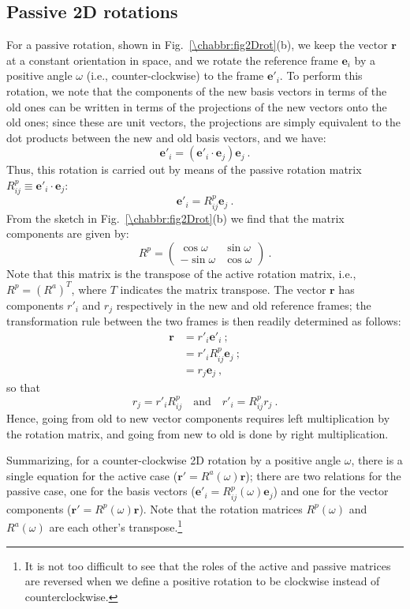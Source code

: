 \subsection{Passive 2D rotations}\label{\chabbr:ssec:2Dpassive}
For a passive rotation, shown in Fig.~\ref{\chabbr:fig2Drot}(b), we keep the vector $\mathbf{r}$ at a constant orientation in space, and we rotate the reference frame $\mathbf{e}_i$ by a positive angle $\omega$ (i.e., counter-clockwise) to the frame $\mathbf{e}'_i$.  To perform this rotation, we note that the components of the new basis vectors in terms of the old ones can be written in terms of the projections of the new vectors onto the old ones; since these are unit vectors, the projections are simply equivalent to the dot products between the new and old basis vectors, and we have:
\[
	\mathbf{e}'_i = (\mathbf{e}'_i\cdot\mathbf{e}_j)\mathbf{e}_j \ .
\]
Thus, this rotation is carried out by means of the passive rotation matrix $R^p_{ij}\equiv \mathbf{e}'_i\cdot\mathbf{e}_j$:
\[
	\mathbf{e}'_i = R^p_{ij}\mathbf{e}_j \ .
\]
From the sketch in Fig.~\ref{\chabbr:fig2Drot}(b) we find that the matrix components are given by:
\[
	R^p = \left(\begin{array}{cc}
	\cos\omega & \sin\omega\\
	-\sin\omega & \cos\omega\end{array}\right) \ .
\]
Note that this matrix is the transpose of the active rotation matrix, i.e., $R^p = (R^a)^T$, where $T$ indicates the matrix transpose.  The vector $\mathbf{r}$ has components $r'_i$ and $r_j$ respectively in the new and old reference frames; the transformation rule between the two frames is then readily determined as follows:
\begin{align*}
	\mathbf{r} &= r'_i\mathbf{e}'_i\ ; \\
	&= r'_i R^p_{ij}\mathbf{e}_j\ ; \\
	&= r_j\mathbf{e}_j\ ,
\end{align*}
so that 
\[
	r_j = r'_i R^p_{ij}\quad\text{and}\quad r'_i = R^p_{ij} r_j\ .
\]
Hence, going from old to new vector components requires left multiplication by the rotation matrix, and going from new to old is done by right multiplication.

Summarizing, for a counter-clockwise 2D rotation by a positive angle $\omega$, there is a single equation for the active case ($\mathbf{r}'=R^a(\omega)\mathbf{r}$); there are two relations for the passive case, one for the basis vectors ($\mathbf{e}'_i=R^p_{ij}(\omega)\mathbf{e}_j$) and one for the vector components ($\mathbf{r}' = R^p(\omega)\mathbf{r}$).  Note that the rotation matrices $R^p(\omega)$ and $R^a(\omega)$ are each other's transpose.\footnote{It is not too difficult to see that the roles of the active and passive matrices are reversed when we define a positive rotation to be clockwise instead of counterclockwise.}






